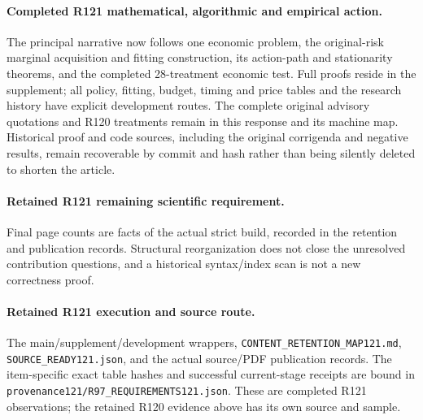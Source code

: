 \paragraph{Completed R121 mathematical, algorithmic and empirical action.}
The principal narrative now follows one economic problem, the original-risk marginal acquisition and fitting construction, its action-path and stationarity theorems, and the completed 28-treatment economic test. Full proofs reside in the supplement; all policy, fitting, budget, timing and price tables and the research history have explicit development routes. The complete original advisory quotations and R120 treatments remain in this response and its machine map. Historical proof and code sources, including the original corrigenda and negative results, remain recoverable by commit and hash rather than being silently deleted to shorten the article.

\paragraph{Retained R121 remaining scientific requirement.}
Final page counts are facts of the actual strict build, recorded in the retention and publication records. Structural reorganization does not close the unresolved contribution questions, and a historical syntax/index scan is not a new correctness proof.

\paragraph{Retained R121 execution and source route.}
The main/supplement/development wrappers, \nolinkurl{CONTENT_RETENTION_MAP121.md}, \nolinkurl{SOURCE_READY121.json}, and the actual source/PDF publication records.
The item-specific exact table hashes and successful current-stage receipts are bound in \nolinkurl{provenance121/R97_REQUIREMENTS121.json}. These are completed R121 observations; the retained R120 evidence above has its own source and sample.
